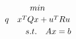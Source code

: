 \documentclass[preview]{standalone}
\begin{document}
\begin{align*}
min \atop {q} \quad x^TQx + u^T R u \\ s.t. \quad Ax = b
\end{align*}
\end{document}
